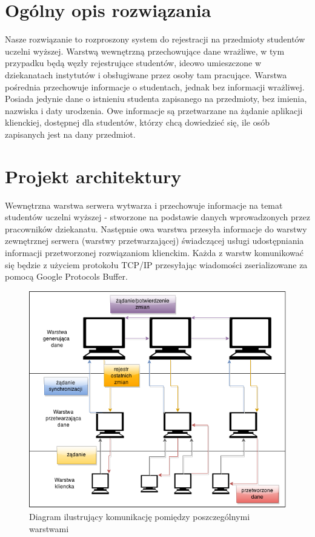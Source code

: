 \section[Ogólny opis rozwiązania]{Ogólny opis rozwiązania}

\par{Nasze rozwiązanie to rozproszony system do rejestracji na przedmioty studentów uczelni wyższej. Warstwą wewnętrzną przechowujące dane wrażliwe, w tym przypadku będą węzły rejestrujące studentów, ideowo umieszczone w dziekanatach instytutów i obsługiwane przez osoby tam pracujące. Warstwa pośrednia przechowuje informacje o studentach, jednak bez informacji wrażliwej. Posiada jedynie dane o istnieniu studenta zapisanego na przedmioty, bez imienia, nazwiska i daty urodzenia. Owe informacje są przetwarzane na żądanie aplikacji klienckiej, dostępnej dla studentów, którzy chcą dowiedzieć się, ile osób zapisanych jest na dany przedmiot.}

\section[Projekt architektury]{Projekt architektury}

\par{Wewnętrzna warstwa serwera wytwarza i przechowuje informacje na temat studentów uczelni wyższej - stworzone na podstawie danych wprowadzonych przez pracowników dziekanatu. Następnie owa warstwa przesyła informacje do warstwy zewnętrznej serwera (warstwy przetwarzającej) świadczącej usługi udostępniania informacji przetworzonej rozwiązaniom klienckim. Każda z warstw komunikować się będzie z użyciem protokołu TCP/IP przesyłając wiadomości zserializowane za pomocą Google Protocols Buffer.}

\begin{figure}[h!tb]
\begin{center}
\includegraphics[width=0.9\linewidth]{img/dane_net.png} 
\caption{Diagram ilustrujący komunikację pomiędzy poszczególnymi warstwami}
\label{img:dane_net}
\end{center}
\end{figure}

